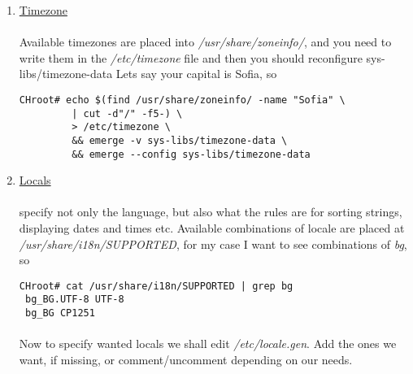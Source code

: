 \documentclass[11pt,a4paper]{article}
\begin{document}
                \begin{enumerate}
                    \item  \href{https://wiki.gentoo.org/wiki/Handbook:AMD64/Installation/Base#Timezone}{Timezone}

                        \paragraph{} Available timezones are placed into \textit{/usr/share/zoneinfo/}, and you need to write them in the \textit{/etc/timezone} file and then you should reconfigure  sys-libs/timezone-data Lets say your capital is Sofia, so

                        \begin{lstlisting}[style=BashInputCHRoot]
 CHroot# echo $(find /usr/share/zoneinfo/ -name "Sofia" \
         | cut -d"/" -f5-) \
         > /etc/timezone \
         && emerge -v sys-libs/timezone-data \
         && emerge --config sys-libs/timezone-data
                        \end{lstlisting}

                    \newpage
                    \item   \href{https://wiki.gentoo.org/wiki/Handbook:AMD64/Installation/Base#Configure_locales}{Locals}

                        \paragraph{} specify not only the language, but also what the rules are for sorting strings, displaying dates and times etc. Available combinations of locale are placed at \textit{/usr/share/i18n/SUPPORTED}, for my case I want to see combinations of \textit{bg}, so

                        \begin{lstlisting}[style=BashInputCHRoot]
 CHroot# cat /usr/share/i18n/SUPPORTED | grep bg
 bg_BG.UTF-8 UTF-8
 bg_BG CP1251
                        \end{lstlisting}

                        \paragraph{} Now to specify wanted locals we shall edit \textit{/etc/locale.gen}. Add the ones we want, if missing, or comment/uncomment depending on our needs.

                        


\end{enumerate}
\end{document}
